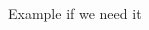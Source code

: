 \documentclass[twocolumn,showpacs,%
  nofootinbib,aps,superscriptaddress,%
  eqsecnum,prd,notitlepage,showkeys,10pt]{revtex4-1}
\begin{document}




\begin{thebibliography}{9}

 Example if we need it





\end{thebibliography}
\end{document}
